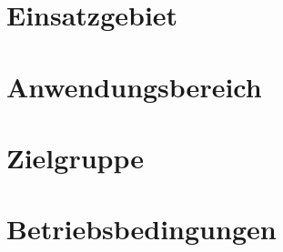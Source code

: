 \section{Einsatzgebiet}
\section{Anwendungsbereich}
\section{Zielgruppe}
\section{Betriebsbedingungen} 
